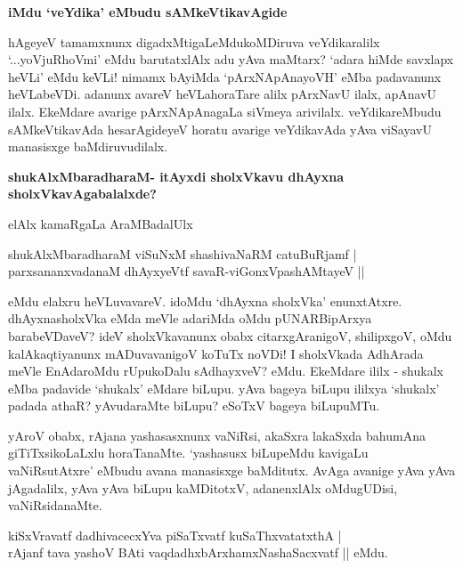 {\bigskip
\noindent
{\large\bf iMdu `veYdika' eMbudu sAMkeVtikavAgide}}\label{page206}
\medskip

\noindent
hAgeyeV tamamxnunx digadxMtigaLeMdukoMDiruva veYdikaralilx `...yoVjuRhoVmi' eMdu barutatxlAlx adu yAva maMtarx? `adara hiMde savxlapx heVLi' eMdu keVLi! nimamx bAyiMda `pArxNApAnayoVH' eMba padavanunx heVLabeVDi. adanunx avareV heVLahoraTare alilx pArxNavU ilalx, apAnavU ilalx. EkeMdare avarige pArxNApAnagaLa siVmeya arivilalx. veYdikareMbudu sAMkeVtikavAda hesarAgideyeV horatu avarige veYdikavAda yAva viSayavU manasisxge baMdiruvudilalx.

{\bigskip
\noindent
{\large\bf shukAlxMbaradharaM- itAyxdi sholxVkavu dhAyxna sholxVkavAgabalalxde?}}\label{page206}
\medskip

\noindent
elAlx kamaRgaLa AraMBadalUlx

\begin{shloka}
shukAlxMbaradharaM viSuNxM shashivaNaRM catuBuRjamf |\\\label{207}
parxsananxvadanaM dhAyxyeVtf savaR-viGonxVpashAMtayeV ||
\end{shloka}

\noindent
eMdu elalxru heVLuvavareV. idoMdu `dhAyxna sholxVka' enunxtAtxre. dhAyxnasholxVka eMda meVle adariMda oMdu pUNARBipArxya barabeVDaveV? ideV sholxVkavanunx obabx citarxgAranigoV, shilipxgoV, oMdu kalAkaqtiyanunx mADuvavanigoV koTuTx noVDi! I sholxVkada AdhArada meVle EnAdaroMdu rUpukoDalu sAdhayxveV? eMdu. EkeMdare ililx - shukalx eMba padavide `shukalx' eMdare biLupu. yAva bageya biLupu ililxya `shukalx' padada athaR? yAvudaraMte biLupu? eSoTxV bageya biLu\-puMTu. 

yAroV obabx, rAjana yashasasxnunx vaNiRsi, akaSxra lakaSxda bahumAna giTiTxsikoLaLxlu horaTanaMte. `yasha\-susx biLupeMdu kavigaLu vaNiRsutAtxre' eMbudu avana manasisxge baMditutx. AvAga avanige yAva yAva jAgadalilx, yAva yAva biLupu kaMDitotxV, adanenxlAlx oMdugUDisi, vaNiRsidanaMte.

\begin{shloka}
kiSxVravatf dadhivacecxYva piSaTxvatf kuSaThxvatatxthA |\\\label{207a}
rAjanf tava yashoV BAti vaqdadhxbArxhamxNashaSacxvatf || eMdu.
\end{shloka}

